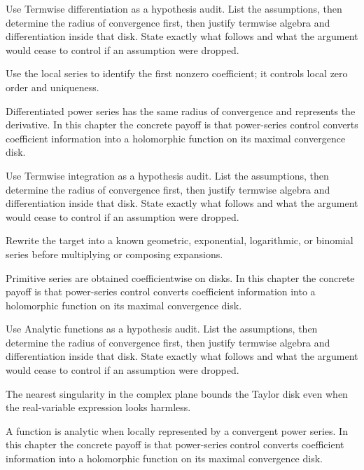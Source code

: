 \begin{exercise}\label{exr:iv03-04}
Use Termwise differentiation as a hypothesis audit. List the assumptions, then determine the radius of convergence first, then justify termwise algebra and differentiation inside that disk. State exactly what follows and what the argument would cease to control if an assumption were dropped.
\end{exercise}
\begin{hint}
Use the local series to identify the first nonzero coefficient; it controls local zero order and uniqueness.
\end{hint}
\begin{solution}
Differentiated power series has the same radius of convergence and represents the derivative. In this chapter the concrete payoff is that power-series control converts coefficient information into a holomorphic function on its maximal convergence disk.
\end{solution}

\begin{exercise}\label{exr:iv03-05}
Use Termwise integration as a hypothesis audit. List the assumptions, then determine the radius of convergence first, then justify termwise algebra and differentiation inside that disk. State exactly what follows and what the argument would cease to control if an assumption were dropped.
\end{exercise}
\begin{hint}
Rewrite the target into a known geometric, exponential, logarithmic, or binomial series before multiplying or composing expansions.
\end{hint}
\begin{solution}
Primitive series are obtained coefficientwise on disks. In this chapter the concrete payoff is that power-series control converts coefficient information into a holomorphic function on its maximal convergence disk.
\end{solution}

\begin{exercise}\label{exr:iv03-06}
Use Analytic functions as a hypothesis audit. List the assumptions, then determine the radius of convergence first, then justify termwise algebra and differentiation inside that disk. State exactly what follows and what the argument would cease to control if an assumption were dropped.
\end{exercise}
\begin{hint}
The nearest singularity in the complex plane bounds the Taylor disk even when the real-variable expression looks harmless.
\end{hint}
\begin{solution}
A function is analytic when locally represented by a convergent power series. In this chapter the concrete payoff is that power-series control converts coefficient information into a holomorphic function on its maximal convergence disk.
\end{solution}

